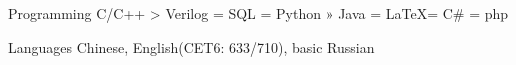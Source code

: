 

\begin{cvskills}

  \cvskill
    {Programming} %
    {C/C++ > Verilog = SQL = Python » Java = \LaTeX = C\# = php} %

  \cvskill
    {Languages} %
    {Chinese, English(CET6: 633/710), basic Russian} %

\end{cvskills}

